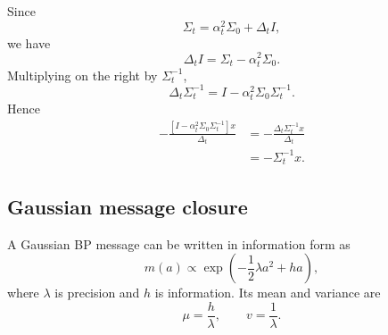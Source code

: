 \documentclass[11pt]{article}
\begin{document}
Since
\begin{equation}
  \Sigma_t=\alpha_t^2\Sigma_0+\Delta_t I,
\end{equation}
we have
\begin{equation}
  \Delta_t I=\Sigma_t-\alpha_t^2\Sigma_0.
\end{equation}
Multiplying on the right by \(\Sigma_t^{-1}\),
\begin{equation}
  \Delta_t\Sigma_t^{-1}=I-\alpha_t^2\Sigma_0\Sigma_t^{-1}.
\end{equation}
Hence
\begin{align}
  -\frac{[I-\alpha_t^2\Sigma_0\Sigma_t^{-1}]x}{\Delta_t}
  &= -\frac{\Delta_t\Sigma_t^{-1}x}{\Delta_t}\\
  &= -\Sigma_t^{-1}x.
\end{align}

\subsection{Gaussian message closure}
\label{sec:closureforms}

A Gaussian BP message can be written in information form as
\begin{equation}
  m(a)\propto \exp\left(-\frac12\lambda a^2+ha\right),
  \label{eq:gaussian-message}
\end{equation}
where \(\lambda\) is precision and \(h\) is information. Its mean and variance are
\begin{equation}
  \mu=\frac{h}{\lambda},
  \qquad
  v=\frac{1}{\lambda}.
\end{equation}
\end{document}
